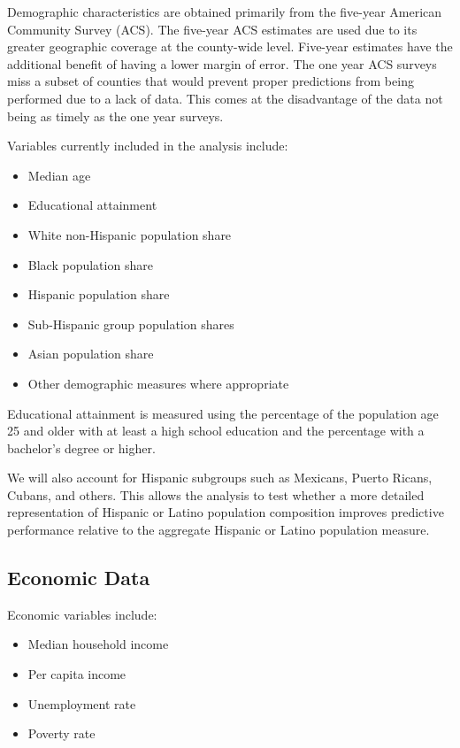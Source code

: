 \documentclass[12pt]{article}
\begin{document}
	Demographic characteristics are obtained primarily from the five-year American
	Community Survey (ACS). The five-year ACS estimates are used due to its greater geographic coverage at the county-wide level. Five-year estimates have the additional benefit of having a lower margin of error. The one year ACS surveys miss a subset of counties that would prevent proper predictions from being performed due to a lack of data. This comes at the disadvantage of the data not being as timely as the one year surveys.
	
	Variables currently included in the analysis include:
	
	\begin{itemize}
		\item Median age
		\item Educational attainment
		\item White non-Hispanic population share
		\item Black population share
		\item Hispanic population share
		\item Sub-Hispanic group population shares
		\item Asian population share
		\item Other demographic measures where appropriate
	\end{itemize}
	
	Educational attainment is measured using the percentage of the
	population age 25 and older with at least a high school education and
	the percentage with a bachelor's degree or higher.
	
	We will also account for Hispanic subgroups such as Mexicans, Puerto Ricans, Cubans, and others. This allows the analysis to test whether a more
	detailed representation of Hispanic or Latino population composition
	improves predictive performance relative to the aggregate Hispanic or
	Latino population measure.
	
	\subsection{Economic Data}
	
	Economic variables include:
	
	\begin{itemize}
		\item Median household income
		\item Per capita income
		\item Unemployment rate
		\item Poverty rate
	\end{itemize}
	
\end{document}
